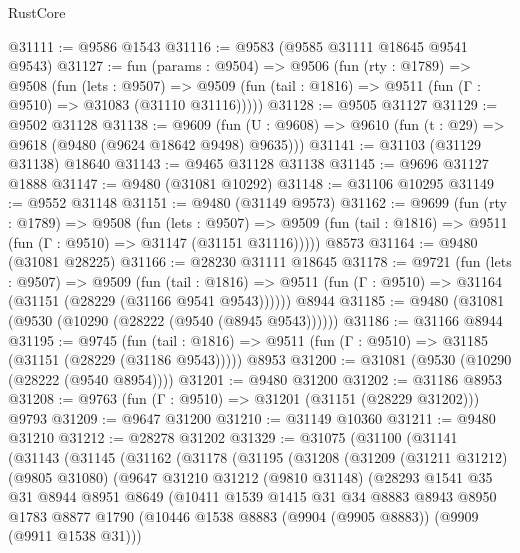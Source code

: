 \begin{lexlean}{RustCore}
\begin{coremodule}
@31111 := @9586 @1543
@31116 := @9583 (@9585 @31111 @18645 @9541 @9543)
@31127 := fun (params : @9504) =>
  @9506
    (fun (rty : @1789) =>
    @9508
      (fun (lets : @9507) =>
      @9509 (fun (tail : @1816) => @9511 (fun (Γ : @9510) => @31083 (@31110 @31116)))))
@31128 := @9505 @31127
@31129 := @9502 @31128
@31138 := @9609
    (fun (U : @9608) => @9610 (fun (t : @29) => @9618 (@9480 (@9624 @18642 @9498) @9635)))
@31141 := @31103 (@31129 @31138) @18640
@31143 := @9465 @31128 @31138
@31145 := @9696 @31127 @1888
@31147 := @9480 (@31081 @10292)
@31148 := @31106 @10295
@31149 := @9552 @31148
@31151 := @9480 (@31149 @9573)
@31162 := @9699
    (fun (rty : @1789) =>
    @9508
      (fun (lets : @9507) =>
      @9509 (fun (tail : @1816) => @9511 (fun (Γ : @9510) => @31147 (@31151 @31116)))))
    @8573
@31164 := @9480 (@31081 @28225)
@31166 := @28230 @31111 @18645
@31178 := @9721
    (fun (lets : @9507) =>
    @9509
      (fun (tail : @1816) =>
      @9511 (fun (Γ : @9510) => @31164 (@31151 (@28229 (@31166 @9541 @9543))))))
    @8944
@31185 := @9480 (@31081 (@9530 (@10290 (@28222 (@9540 (@8945 @9543))))))
@31186 := @31166 @8944
@31195 := @9745
    (fun (tail : @1816) => @9511 (fun (Γ : @9510) => @31185 (@31151 (@28229 (@31186 @9543)))))
    @8953
@31200 := @31081 (@9530 (@10290 (@28222 (@9540 @8954))))
@31201 := @9480 @31200
@31202 := @31186 @8953
@31208 := @9763 (fun (Γ : @9510) => @31201 (@31151 (@28229 @31202))) @9793
@31209 := @9647 @31200
@31210 := @31149 @10360
@31211 := @9480 @31210
@31212 := @28278 @31202
@31329 := @31075
    (@31100
      (@31141
        (@31143
          (@31145
            (@31162
              (@31178
                (@31195
                  (@31208
                    (@31209
                      (@31211 @31212)
                      (@9805 @31080)
                      (@9647
                        @31210
                        @31212
                        (@9810 @31148)
                        (@28293
                          @1541
                          @35
                          @31
                          @8944
                          @8951
                          @8649
                          (@10411
                            @1539
                            @1415
                            @31
                            @34
                            @8883
                            @8943
                            @8950
                            @1783
                            @8877
                            @1790
                            (@10446 @1538 @8883 (@9904 (@9905 @8883)) (@9909 (@9911 @1538 @31)))

\end{coremodule}
\end{lexlean}
